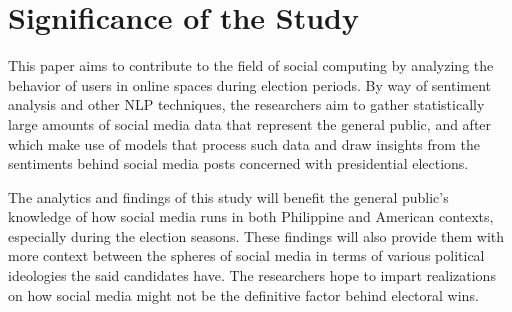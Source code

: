 \section{Significance of the Study}
This paper aims to contribute to the field of social computing by analyzing the behavior of users in online spaces during election periods. By way of sentiment analysis and other NLP techniques, the researchers aim to gather statistically large amounts of social media data that represent the general public, and after which make use of models that process such data and draw insights from the sentiments behind social media posts concerned with presidential elections. 

The analytics and findings of this study will benefit the general public's knowledge of how social media runs in both Philippine and American contexts, especially during the election seasons. These findings will also provide them with more context between the spheres of social media in terms of various political ideologies the said candidates have. The researchers hope to impart realizations on how social media might not be the definitive factor behind electoral wins.
